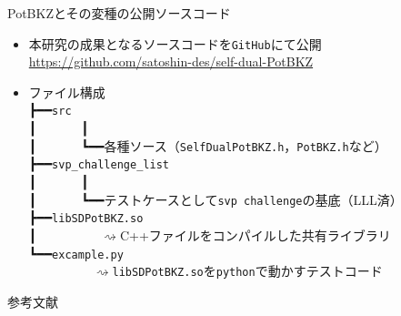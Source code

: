 \documentclass[12pt,aspectratio=169,xcolor=dvipsnames,table,dvipdfmx, leqno]{beamer}
\begin{document}
\begin{frame}{PotBKZとその変種の公開ソースコード}
\begin{itemize}
    \item 本研究の成果となるソースコードを\texttt{GitHub}にて公開\\
    \url{https://github.com/satoshin-des/self-dual-PotBKZ}
    \item ファイル構成\\
    ┣━━\texttt{src}\\
    ┃~~~~~~~┃\\
    ┃~~~~~~~┗━━各種ソース（\texttt{SelfDualPotBKZ.h}，\texttt{PotBKZ.h}など）\\
    ┣━━\texttt{svp\_challenge\_list}\\
    ┃~~~~~~~┃\\
    ┃~~~~~~~┗━━テストケースとして\texttt{svp~challenge}\cite{SVP}の基底（LLL済）\\
    ┣━━\texttt{libSDPotBKZ.so}\\
    ┃~~~~~~~~~~$\rightsquigarrow$C++ファイルをコンパイルした共有ライブラリ\\
    ┗━━\texttt{excample.py}\\
    \quad~~~~~~~~~~$\rightsquigarrow$\texttt{libSDPotBKZ.so}を\texttt{python}で動かすテストコード
\end{itemize}
\end{frame}

\begin{frame}[allowframebreaks]{参考文献}
\beamertemplatetextbibitems


\end{frame}
\end{document}
